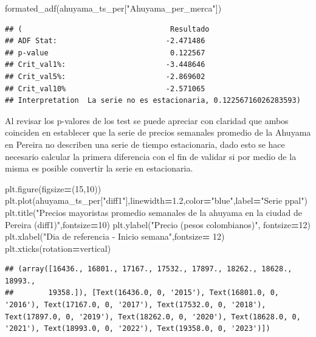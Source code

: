 \documentclass[
]{book}
\newenvironment{Shaded}{\begin{snugshade}}{\end{snugshade}}
\newcommand{\DecValTok}[1]{\textcolor[rgb]{0.00,0.00,0.81}{#1}}
\newcommand{\FloatTok}[1]{\textcolor[rgb]{0.00,0.00,0.81}{#1}}
\newcommand{\NormalTok}[1]{#1}
\newcommand{\OperatorTok}[1]{\textcolor[rgb]{0.81,0.36,0.00}{\textbf{#1}}}
\newcommand{\StringTok}[1]{\textcolor[rgb]{0.31,0.60,0.02}{#1}}
\begin{document}
\begin{Shaded}
\begin{Highlighting}[]
\NormalTok{formated\_adf(ahuyama\_ts\_per[}\StringTok{"Ahuyama\_per\_merca"}\NormalTok{])}
\end{Highlighting}
\end{Shaded}

\begin{verbatim}
## (                                  Resultado
## ADF Stat:                         -2.471486
## p-value                            0.122567
## Crit_val1%:                       -3.448646
## Crit_val5%:                       -2.869602
## Crit_val10%                       -2.571065
## Interpretation  La serie no es estacionaria, 0.12256716026283593)
\end{verbatim}

Al revisar los p-valores de los test se puede apreciar con claridad que ambos coinciden en establecer que la serie de precios semanales promedio de la Ahuyama en Pereira no describen una serie de tiempo estacionaria, dado esto se hace necesario calcular la primera diferencia con el fin de validar si por medio de la misma es posible convertir la serie en estacionaria.

\begin{Shaded}
\begin{Highlighting}[]

\NormalTok{plt.figure(figsize}\OperatorTok{=}\NormalTok{(}\DecValTok{15}\NormalTok{,}\DecValTok{10}\NormalTok{))}
\NormalTok{plt.plot(ahuyama\_ts\_per[}\StringTok{"diff1"}\NormalTok{],linewidth}\OperatorTok{=}\FloatTok{1.2}\NormalTok{,color}\OperatorTok{=}\StringTok{"blue"}\NormalTok{,label}\OperatorTok{=}\StringTok{"Serie ppal"}\NormalTok{)}
\NormalTok{plt.title(}\StringTok{"Precios mayoristas promedio semanales de la ahuyama en la ciudad de Pereira (diff1)"}\NormalTok{,fontsize}\OperatorTok{=}\DecValTok{10}\NormalTok{)}
\NormalTok{plt.ylabel(}\StringTok{"Precio (pesos colombianos)"}\NormalTok{, fontsize}\OperatorTok{=}\DecValTok{12}\NormalTok{)}
\NormalTok{plt.xlabel(}\StringTok{"Dia de referencia {-} Inicio semana"}\NormalTok{,fontsize}\OperatorTok{=} \DecValTok{12}\NormalTok{)}
\NormalTok{plt.xticks(rotation}\OperatorTok{=}\StringTok{\textquotesingle{}vertical\textquotesingle{}}\NormalTok{)}
\end{Highlighting}
\end{Shaded}

\begin{verbatim}
## (array([16436., 16801., 17167., 17532., 17897., 18262., 18628., 18993.,
##        19358.]), [Text(16436.0, 0, '2015'), Text(16801.0, 0, '2016'), Text(17167.0, 0, '2017'), Text(17532.0, 0, '2018'), Text(17897.0, 0, '2019'), Text(18262.0, 0, '2020'), Text(18628.0, 0, '2021'), Text(18993.0, 0, '2022'), Text(19358.0, 0, '2023')])
\end{verbatim}
\end{document}
